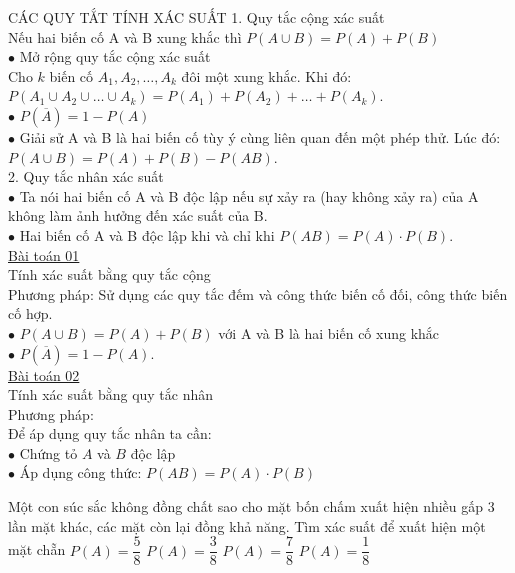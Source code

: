 \begin{dang}{CÁC QUY TẮT TÍNH XÁC SUẤT}
1. Quy tắc cộng xác suất\\
Nếu hai biến cố A và B xung khắc thì $P(A\cup B)=P(A)+P(B)$\\
$\bullet $ Mở rộng quy tắc cộng xác suất\\
Cho $k$ biến cố $A_1,A_2,\ldots ,A_k$ đôi một xung khắc. Khi đó:\\
$P(A_1\cup A_2\cup \ldots \cup A_k)=P(A_1)+P(A_2)+\ldots +P(A_k)$.\\
$\bullet $ $P(\overline{A})=1-P(A)$\\
$\bullet $ Giải sử A và B là hai biến cố tùy ý cùng liên quan đến một phép thử. Lúc đó: $P(A\cup B)=P(A)+P(B)-P(AB)$.\\
2. Quy tắc nhân xác suất\\
$\bullet $ Ta nói hai biến cố A và B độc lập nếu sự xảy ra (hay không xảy ra) của A không làm ảnh hưởng đến xác suất của B. \\
$\bullet $ Hai biến cố A và B độc lập khi và chỉ khi $P(AB)=P(A)\cdot P(B)$.\\
\underline{Bài toán 01}\\
Tính xác suất bằng quy tắc cộng\\
Phương pháp: Sử dụng các quy tắc đếm và công thức biến cố đối, công thức biến cố hợp.\\
$\bullet $ $P(A\cup B)=P(A)+P(B)$ với A và B là hai biến cố xung khắc\\
$\bullet $ $P(\overline{A})=1-P(A)$.\\
\underline{Bài toán 02}\\
Tính xác suất bằng quy tắc nhân\\
Phương pháp:\\
Để áp dụng quy tắc nhân ta cần:\\
 $\bullet $ Chứng tỏ $A$ và $B$ độc lập\\
 $\bullet $ Áp dụng công thức: $P(AB)=P(A) \cdot P(B)$
\end{dang}
\begin{ex}
Một con súc sắc không đồng chất sao cho mặt bốn chấm xuất hiện nhiều gấp 3 lần mặt khác, các mặt còn lại đồng khả năng. Tìm xác suất để xuất hiện một mặt chẵn
\choice
{\True $P(A)=\dfrac{5}{8}$}
{$P(A)=\dfrac{3}{8}$}
{$P(A)=\dfrac{7}{8}$}
{$P(A)=\dfrac{1}{8}$}
\end{ex}
